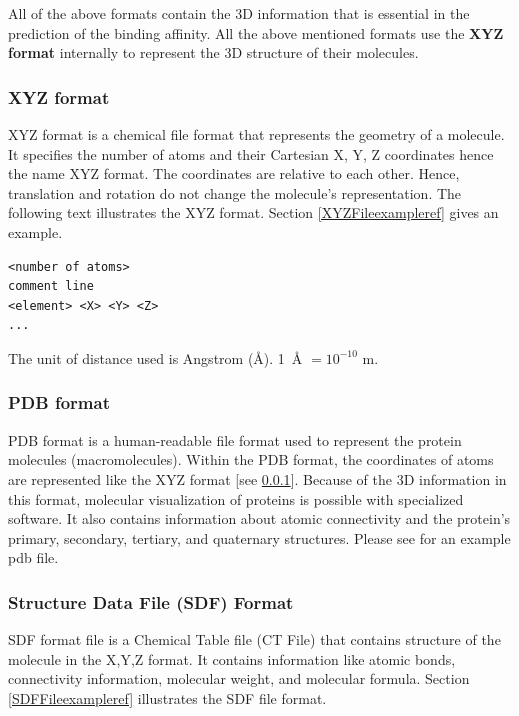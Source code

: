 \documentclass[11pt]{article}
\begin{document}
All of the above formats contain the 3D information that is essential in the prediction of the binding affinity.
All the above mentioned formats use the \textbf{XYZ format} internally to represent the 3D structure of their molecules.

\subsubsection{XYZ format}
\label{xyz_format}
XYZ format is a chemical file format that represents the geometry of a molecule.
It specifies the number of atoms and their Cartesian X, Y, Z coordinates hence the name XYZ format.
The coordinates are relative to each other. Hence, translation and rotation do not change the molecule's representation. 
The following text illustrates the XYZ format.
Section \ref{XYZFileexampleref} gives an example.
\cite{XYZ_format}
\begin{verbatim}
<number of atoms>
comment line
<element> <X> <Y> <Z>
...
\end{verbatim}

The unit of distance used is Angstrom (\si{\angstrom}).  \SI{1}{\angstrom} $ = 10^{-10}$ m.
\cite{XYZ_format}

\subsubsection{PDB format}
PDB format is a human-readable file format used to represent the protein molecules (macromolecules).
Within the PDB format,  the coordinates of atoms are represented like the XYZ format [see \ref{xyz_format}].
Because of the 3D information in this format,  molecular visualization of proteins is possible with specialized software. 
It also contains information about atomic connectivity and the protein's primary,  secondary,  tertiary,  and quaternary structures.
\cite{pdb_file_format}
\cite{understanding_pdb_format}
Please see \cite{examplePDBFile} for an example pdb file.


\subsubsection{Structure Data File (SDF) Format}
SDF format file is a Chemical Table file (CT File) that contains structure of the molecule in the X,Y,Z format.
It contains information like atomic bonds,  connectivity information,  molecular weight,  and molecular formula. \cite{SDFformat}
Section \ref{SDFFileexampleref} illustrates the SDF file format.
\end{document}
